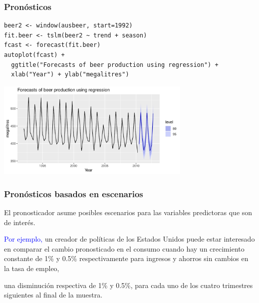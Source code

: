 \documentclass[10pt]{beamer}
\begin{document}
\begin{frame}[fragile]
\frametitle{Pronósticos}



\lstset{language=r,label= ,caption= ,captionpos=b,numbers=none}
\begin{lstlisting}
beer2 <- window(ausbeer, start=1992)
fit.beer <- tslm(beer2 ~ trend + season)
fcast <- forecast(fit.beer)
autoplot(fcast) +
  ggtitle("Forecasts of beer production using regression") +
  xlab("Year") + ylab("megalitres")
\end{lstlisting}

\pause

\begin{center}
\includegraphics[width=0.7\textwidth]{5-regression_files/figure-beamer/beeryetagain-1.pdf}
\end{center} 
\end{frame}




\begin{frame}[fragile]
\frametitle{Pronósticos basados en escenarios}

El pronosticador asume posibles escenarios para las variables predictoras que son de interés. 

\vspace{4mm}

\textcolor{blue}{Por ejemplo,} un creador de políticas de los Estados Unidos puede estar interesado en comparar el cambio pronosticado en el consumo cuando hay un crecimiento constante de 1\% y 0.5\% respectivamente para ingresos y ahorros sin cambios en la tasa de empleo,

\begin{center}
\end{center}
 
una disminución respectiva de 1\% y 0.5\%, para cada uno de los cuatro trimestres siguientes al final de la muestra.


\end{frame}
\end{document}
